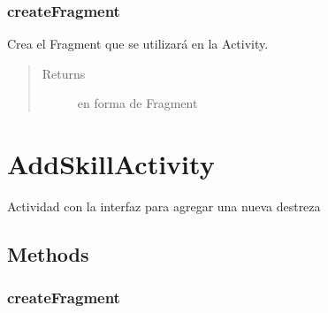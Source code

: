 \documentclass[letterpaper,10pt,english]{sphinxmanual}
\begin{document}
\subsubsection{createFragment}
\label{Activities/SkillsActivity:createfragment}

\begin{fulllineitems}
\label{Activities/SkillsActivity:com.fiuba.tallerii.jobify.SkillsActivity.createFragment()}
Crea el Fragment que se utilizará en la Activity.
\begin{quote}\begin{description}
\item[{Returns}] \leavevmode
{} en forma de Fragment

\end{description}\end{quote}

\end{fulllineitems}



\section{AddSkillActivity}
\label{Activities/AddSkillActivity::doc}\label{Activities/AddSkillActivity:addskillactivity}

\begin{fulllineitems}
\label{Activities/AddSkillActivity:com.fiuba.tallerii.jobify.AddSkillActivity}
Actividad con la interfaz para agregar una nueva destreza

\end{fulllineitems}



\subsection{Methods}
\label{Activities/AddSkillActivity:methods}

\subsubsection{createFragment}
\label{Activities/AddSkillActivity:createfragment}
\end{document}
